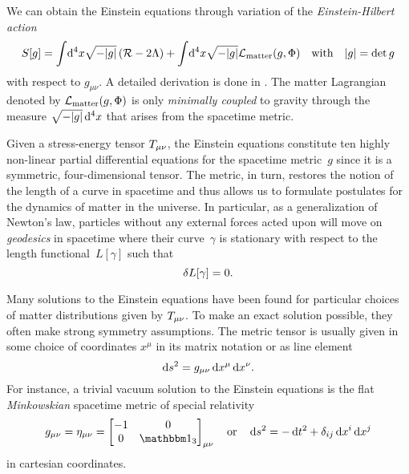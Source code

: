 \documentclass[12pt,parskip=half]{scrreprt}
\begin{document}
We can obtain the Einstein equations through variation of the \emph{Einstein-Hilbert action}
\begin{align}\label{eq:einstein_hilbert_action}
	S[g] = \int \! \dif{^4x} \sqrt{-\metrdet{g}} \del{\Rscal - 2\cosmconst} + \int \! \dif{^4x} \sqrt{-\metrdet{g}} \lagrdensmatter \quad \text{with} \quad \metrdet{g} = \det{g}
\end{align}
with respect to \(g_{\mu \nu}\). A detailed derivation is done in . The matter Lagrangian denoted by \(\mathcal{L}_\textnormal{matter}(g,\Phi)\) is only \emph{minimally coupled} to gravity through the measure \(\sqrt{-\metrdet{g}}\dif{^4x}\) that arises from the spacetime metric.

Given a stress-energy tensor \(T_{\mu \nu}\), the Einstein equations constitute ten highly non-linear partial differential equations for the spacetime metric~\(g\) since it is a symmetric, four-dimensional tensor. The metric, in turn, restores the notion of the length of a curve in spacetime and thus allows us to formulate postulates for the dynamics of matter in the universe. In particular, as a generalization of Newton's law, particles without any external forces acted upon will move on \emph{geodesics} in spacetime where their curve~\(\gamma\) is stationary with respect to the length functional~\(L[\gamma]\) such that
\begin{equation}
	\delta L[\gamma] = 0
	\mathpunct{.}
\end{equation}

Many solutions to the Einstein equations have been found for particular choices of matter distributions given by \(T_{\mu\nu}\). To make an exact solution possible, they often make strong symmetry assumptions. The metric tensor is usually given in some choice of coordinates \(x^\mu\) in its matrix notation or as line element
\begin{equation}
	\dif{s}^2 = g_{\mu \nu}\dif{x}^\mu \dif{x}^\nu
	\eqpunct{.}
\end{equation}
For instance, a trivial vacuum solution to the Einstein equations is the flat \emph{Minkowskian} spacetime metric of special relativity
\begin{equation}
	g_{\mu \nu} = \eta_{\mu \nu} =
	\begin{bmatrix}
		-1 & 0 \\
		0 & \idmat_3
	\end{bmatrix}_{\mu \nu} \quad \text{or} \quad \dif{s}^2 = -\dif{t}^2 + \delta_{ij} \dif{x}^i \dif{x}^j
\end{equation}
in cartesian coordinates.  
\end{document}
